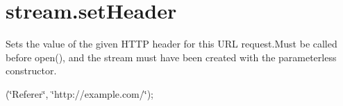 \hypertarget{stream_8setHeader-example}{}\section{stream.\+set\+Header}
Sets the value of the given H\+T\+TP header for this U\+RL request.\+Must be called before open(), and the stream must have been created with the parameterless constructor.

(\char`\"{}\+Referer\char`\"{}, \char`\"{}http\+://example.\+com/\char`\"{});


\begin{DoxyCodeInclude}
\end{DoxyCodeInclude}
 
